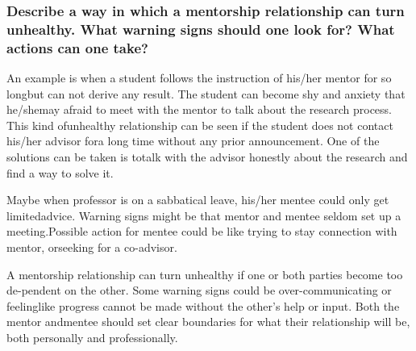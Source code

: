 \documentclass{beamer}
\begin{document}
\begin{frame} %
  \frametitle{ Describe a way in which a mentorship relationship can turn unhealthy. What warning signs should one look for? What actions can one take?
  }
  
  \medskip

  An  example  is  when  a  student  follows  the  instruction  of  his/her  mentor  for  so  longbut can not derive any result.  The student can become shy and anxiety that he/shemay afraid to meet with the mentor to talk about the research process.  This kind ofunhealthy relationship can be seen if the student does not contact his/her advisor fora long time without any prior announcement.  One of the solutions can be taken is totalk with the advisor honestly about the research and find a way to solve it.

  Maybe when professor is on a sabbatical leave, his/her mentee could only get limitedadvice.   Warning  signs  might  be  that  mentor  and  mentee  seldom  set  up  a  meeting.Possible  action  for  mentee  could  be  like  trying  to  stay  connection  with  mentor,  orseeking for a co-advisor.


  A mentorship relationship can turn unhealthy if one or both parties become too de-pendent  on  the  other.   Some  warning  signs  could  be  over-communicating  or  feelinglike progress cannot be made without the other’s help or input.  Both the mentor andmentee should set clear boundaries for what their relationship will be, both personally and professionally.

  







\end{frame}
\end{document}

